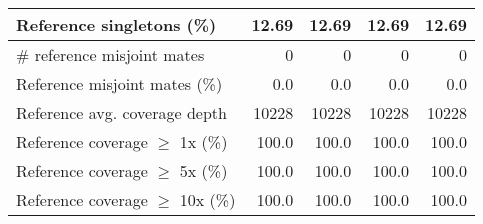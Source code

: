 \documentclass[12pt,a4paper]{article}
\begin{document}
\begin{table}[ht]
\begin{center}
\begin{tabular}{|l*{4}{|r}|}
Reference singletons (\%) & 12.69 & 12.69 & 12.69 & 12.69 \\ \hline
\# reference misjoint mates & 0 & 0 & 0 & 0 \\ \hline
Reference misjoint mates (\%) & 0.0 & 0.0 & 0.0 & 0.0 \\ \hline
Reference avg. coverage depth & 10228 & 10228 & 10228 & 10228 \\ \hline
Reference coverage $\geq$ 1x (\%) & 100.0 & 100.0 & 100.0 & 100.0 \\ \hline
Reference coverage $\geq$ 5x (\%) & 100.0 & 100.0 & 100.0 & 100.0 \\ \hline
Reference coverage $\geq$ 10x (\%) & 100.0 & 100.0 & 100.0 & 100.0 \\ \hline
\end{tabular}
\end{center}
\end{table}
\end{document}
